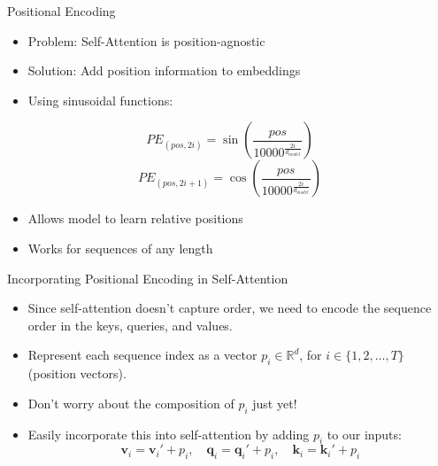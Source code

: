 \documentclass[serif, aspectratio=169]{beamer}
\begin{document}
\begin{frame}{Positional Encoding}
    \begin{itemize}
        \item Problem: Self-Attention is position-agnostic
        \item Solution: Add position information to embeddings
        \item Using sinusoidal functions:
    \end{itemize}
		\begin{equation*}
			PE_{(pos, 2i)} = \sin\left(\frac{pos}{10000^{\frac{2i}{d_{model}}}}\right)
		\end{equation*}
		\begin{equation*}
			PE_{(pos, 2i+1)} = \cos\left(\frac{pos}{10000^{\frac{2i}{d_{model}}}}\right)
		\end{equation*}

    \begin{itemize}
        \item Allows model to learn relative positions
        \item Works for sequences of any length
    \end{itemize}
    
\end{frame}

\begin{frame}{Incorporating Positional Encoding in Self-Attention}
	\begin{itemize}
		\item Since self-attention doesn’t capture order, we need to encode the sequence order in the keys, queries, and values.
		\item Represent each sequence index as a vector \( p_i \in \mathbb{R}^d \), for \( i \in \{1, 2, \dots, T\} \) (position vectors).
		\item Don’t worry about the composition of \( p_i \) just yet!
		\item Easily incorporate this into self-attention by adding \( p_i \) to our inputs:
		\begin{equation*}
			\mathbf{v}_i = \mathbf{v}_i' + p_i, \quad \mathbf{q}_i = \mathbf{q}_i' + p_i, \quad \mathbf{k}_i = \mathbf{k}_i' + p_i
		\end{equation*}
	\end{itemize}
\end{frame}

%
\end{document}

